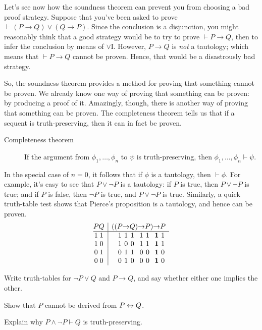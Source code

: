 Let's see now how the soundness theorem can prevent you from choosing
a bad proof strategy.  Suppose that you've been asked to prove
$\vdash (P\to Q)\vee (Q\to P)$. Since the conclusion is a disjunction,
you might reasonably think that a good strategy would be to try to
prove $\vdash P\to Q$, then to infer the conclusion by means of
$\vee$I.  However, $P\to Q$ is {\it not} a tautology; which means that
$\vdash P\to Q$ cannot be proven.  Hence, that would be a disastrously
bad strategy.

So, the soundness theorem provides a method for proving that something
cannot be proven.  We already know one way of proving that something
can be proven: by producing a proof of it.  Amazingly, though, there
is another way of proving that something can be proven.  The
completeness theorem tells us that if a sequent is truth-preserving,
then it can in fact be proven.
\begin{description}
\item[Completeness theorem] If the argument from $\phi _1,\dots ,\phi _n$ to
  $\psi$ is truth-preserving, then
  $\phi _1,\dots ,\phi _n\vdash \psi$.
\end{description}
In the special case of $n=0$, it follows that if $\phi$ is a
tautology, then $\vdash \phi$.  For example, it's easy to see that
$P\vee \neg P$ is a tautology: if $P$ is true, then $P\vee \neg P$ is
true; and if $P$ is false, then $\neg P$ is true, and $P\vee\neg P$ is
true.  Similarly, a quick truth-table test shows that Pierce's
proposition is a tautology, and hence can be proven.
\[ \begin{array}{@{ }c@{ }@{ }c | c@{ }@{}c@{}@{}c@{}@{ }c@{ }@{ }c@{ }@{ }c@{ }@{}c@{}@{ }c@{ }@{ }c@{ }@{}c@{}@{ }c@{ }@{ }c@{ }@{ }c}
P & Q &  & ( & ( & P & \rightarrow & Q & ) & \rightarrow & P & ) & \rightarrow & P & \\
\hline 
1 & 1 &  &  &  & 1 & 1 & 1 &  & 1 & 1 &  & \mathbf{1} & 1 & \\
1 & 0 &  &  &  & 1 & 0 & 0 &  & 1 & 1 &  & \mathbf{1} & 1 & \\
0 & 1 &  &  &  & 0 & 1 & 1 &  & 0 & 0 &  & \mathbf{1} & 0 & \\
0 & 0 &  &  &  & 0 & 1 & 0 &  & 0 & 0 &  & \mathbf{1} & 0 & \\
   \end{array} \]


 \begin{exercise} Write truth-tables for $\neg P\vee Q$ and $P\to Q$,
   and say whether either one implies the other. \end{exercise}
\begin{exercise} Show that $P$ cannot be derived from $P\leftrightarrow
  Q$. \end{exercise}
\begin{exercise} Explain why $P\wedge\neg P\vdash Q$ is truth-preserving.
\end{exercise}
 

